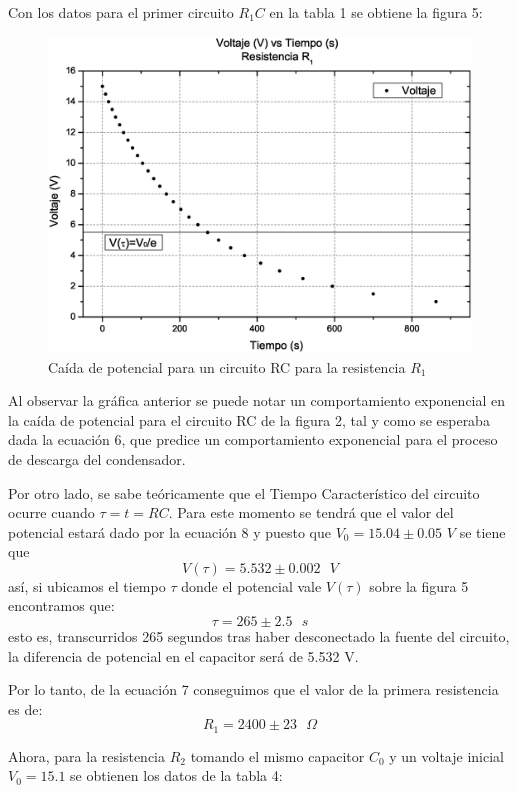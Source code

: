 \documentclass[10pt,letter]{article}
\begin{document}
Con los datos para el primer circuito $R_1C$ en la tabla 1 se obtiene la figura 5:



\begin{figure}[H]
\centering
\includegraphics[scale=0.45]{Resistencia1}
\caption{Caída de potencial para un circuito RC para la resistencia $R_1$}
\label{RCcarga}
\end{figure}

\begin{multicols}{2}
Al observar la gráfica anterior se puede notar un comportamiento exponencial en la caída de potencial para el circuito RC de la figura 2, tal y como se esperaba dada la ecuación 6, que predice un comportamiento exponencial para el proceso de descarga del condensador.  

Por otro lado, se sabe teóricamente que el Tiempo Característico del circuito ocurre cuando $\tau=t=RC$. Para este momento se tendrá que el valor del potencial estará dado por la ecuación 8 y puesto que $V_0=15.04 \pm0.05$ $V$ se tiene que 
$$V(\tau)=5.532 \pm 0.002 \text{ }V$$
así, si ubicamos el tiempo $\tau$ donde el potencial vale $V(\tau)$ sobre la figura 5 encontramos que:
$$\tau=265\pm2.5 \text{ }s$$
esto es, transcurridos 265 segundos tras haber desconectado la fuente del circuito, la diferencia de potencial en el capacitor será de 5.532 V.

Por lo tanto, de la ecuación 7 conseguimos que el valor de la primera resistencia es de:
$$R_1=2400\pm23\text{ }\Omega$$

Ahora, para la resistencia $R_2$  tomando el mismo capacitor $C_0$ y un voltaje inicial $V_0=15.1$ se obtienen los datos de la tabla 4:

\end{multicols}
\end{document}
